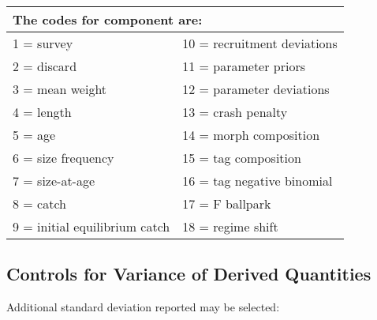 \begin{center}
	\begin{longtable}{ p{7.5cm} p{7.5cm} }
		\multicolumn{2}{l}{The codes for component are:}\\
		\hline
		1 = survey  				  & 10 = recruitment deviations \Tstrut\\	
		2 = discard 				  & 11 = parameter priors\\		
		3 = mean weight 			  & 12 = parameter deviations\\	
		4 = length 					  & 13 = crash penalty\\		
		5 = age 					  & 14 = morph composition\\
		6 = size frequency  		  & 15 = tag composition\\		
		7 = size-at-age 			  & 16 = tag negative binomial\\
		8 = catch 					  & 17 = F ballpark\\		
		9 = initial equilibrium catch & 18 = regime shift \Bstrut\\
		\hline
	\end{longtable}
\end{center}



\subsection{Controls for Variance of Derived Quantities}
Additional standard deviation reported may be selected:

